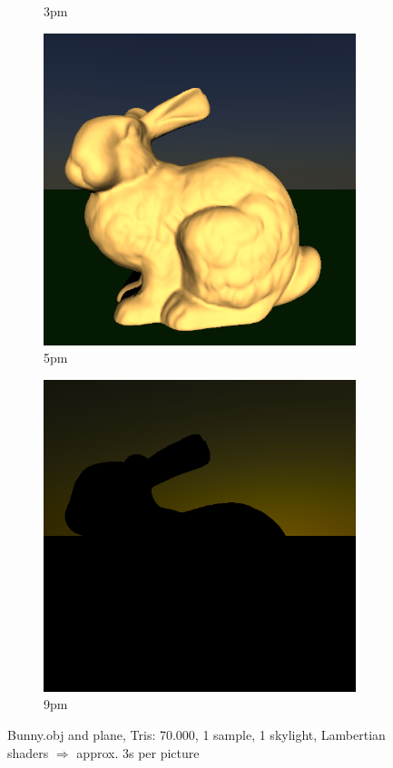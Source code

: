 \documentclass[a4paper]{article}
\begin{document}
\begin{figure}[h]
\begin{subfigure}[b]{0.3\textwidth}
		\caption{3pm}
		\label{fig:skylight15}
	\end{subfigure}
	\begin{subfigure}[b]{0.3\textwidth}
		\includegraphics[width=\textwidth]{week2/2/bunny_17.png}
		\caption{5pm}
		\label{fig:skylight17}
	\end{subfigure}
	\begin{subfigure}[b]{0.3\textwidth}
		\includegraphics[width=\textwidth]{week2/2/bunny_19.png}
		\caption{9pm}
		\label{fig:skylight19}
	\end{subfigure}
	\caption{Bunny.obj and plane, Tris: 70.000, 1 sample, 1 skylight, Lambertian shaders $\Rightarrow$ approx. 3s per picture}
\end{figure}
\end{document}
